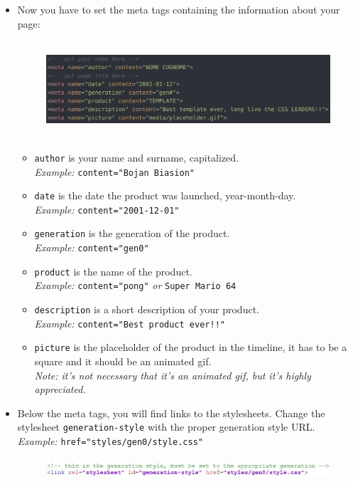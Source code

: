 \documentclass{article}
\begin{document}
\begin{itemize}
    \item Now you have to set the meta tags containing the information about your page:
    \begin{figure}[h]
        \centering
        \includegraphics[height=3.6cm]{meta_tags.png}
    \end{figure}
    \begin{itemize}
        \item \texttt{author} is your name and surname, capitalized.\\
        \textit{Example:} \texttt{content="Bojan Biasion"}
        \item \texttt{date} is the date the product was launched, year-month-day.\\
        \textit{Example:} \texttt{content="2001-12-01"}
        \item \texttt{generation} is the generation of the product.\\
        \textit{Example:} \texttt{content="gen0"}
        \item \texttt{product} is the name of the product.\\
        \textit{Example:} \texttt{content="pong"} \textit{or} \texttt{Super Mario 64}
        \item \texttt{description} is a short description of your product.\\
        \textit{Example:} \texttt{content="Best product ever!!"}
        \item \texttt{picture} is the placeholder of the product in the timeline, it has to be a square and it should be an animated gif.\\
        \textit{Note: it's not necessary that it's an animated gif, but it's highly appreciated.}
    \end{itemize}
    
    \item Below the meta tags, you will find links to the stylesheets. Change the stylesheet \colorbox{grey!7}{\texttt{generation-style}} with the proper generation style URL. \\
    \textit{Example:} \texttt{href="styles/gen0/style.css"}
    \begin{figure}[h]
        \centering
        \includegraphics[height=0.8cm]{generation.jpg}
    \end{figure}
    

\end{itemize}
\end{document}
